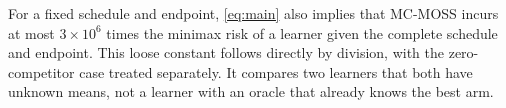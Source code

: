 For a fixed schedule and endpoint, \eqref{eq:main} also implies that MC-MOSS incurs at most $3\times10^6$ times the minimax risk of a learner given the complete schedule and endpoint. This loose constant follows directly by division, with the zero-competitor case treated separately. It compares two learners that both have unknown means, not a learner with an oracle that already knows the best arm.
